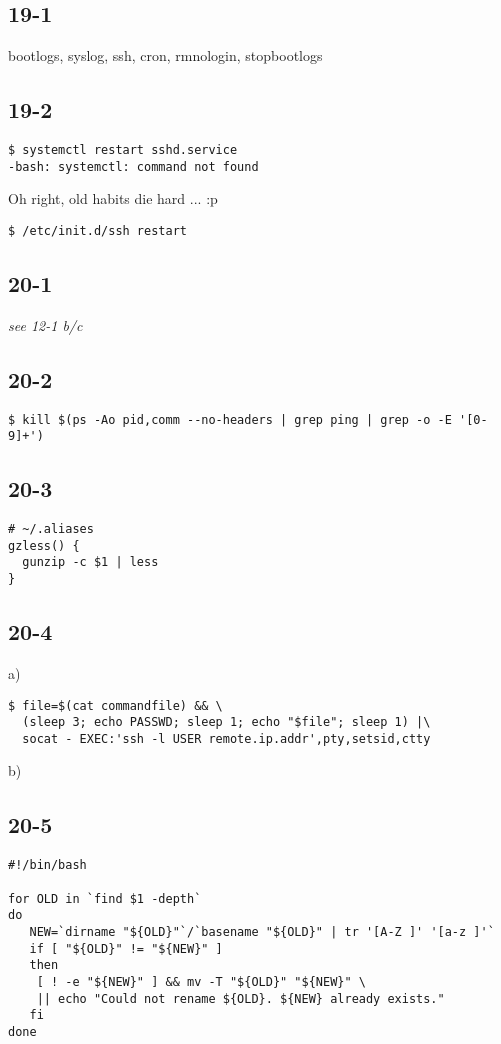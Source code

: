 \subsection{19-1}
bootlogs, syslog, ssh, cron, rmnologin, stopbootlogs

\subsection{19-2}
\begin{verbatim}
$ systemctl restart sshd.service
-bash: systemctl: command not found
\end{verbatim}

Oh right, old habits die hard ... :p

\verb=$ /etc/init.d/ssh restart=

\subsection{20-1}
\emph{see 12-1 b/c}

\subsection{20-2}
\begin{verbatim}$ kill $(ps -Ao pid,comm --no-headers | grep ping | grep -o -E '[0-9]+')\end{verbatim}

\subsection{20-3}
\begin{verbatim}
# ~/.aliases
gzless() {
  gunzip -c $1 | less
}
\end{verbatim}
\subsection{20-4}
a)
\begin{verbatim}
$ file=$(cat commandfile) && \
  (sleep 3; echo PASSWD; sleep 1; echo "$file"; sleep 1) |\
  socat - EXEC:'ssh -l USER remote.ip.addr',pty,setsid,ctty
\end{verbatim}

b)

\subsection{20-5}
\begin{verbatim}
#!/bin/bash

for OLD in `find $1 -depth`
do
   NEW=`dirname "${OLD}"`/`basename "${OLD}" | tr '[A-Z ]' '[a-z ]'`
   if [ "${OLD}" != "${NEW}" ]
   then
	[ ! -e "${NEW}" ] && mv -T "${OLD}" "${NEW}" \
	|| echo "Could not rename ${OLD}. ${NEW} already exists."
   fi
done
\end{verbatim}

